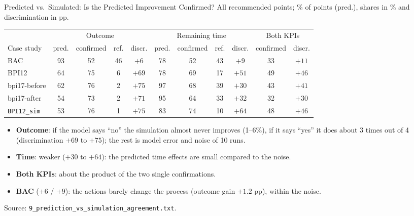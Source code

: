\documentclass[aspectratio=169]{beamer} %
\begin{document}
\iffalse
\begin{frame}{Predicted vs.\ Simulated: Is the Predicted Improvement Confirmed?}
  \footnotesize
  All recommended points; \% of points (pred.), shares in \% and discrimination in pp.
  \begin{center}\scriptsize\setlength{\tabcolsep}{3.5pt}
  \begin{tabular}{l cccc cccc cc}
    \toprule
     & \multicolumn{4}{c}{Outcome} & \multicolumn{4}{c}{Remaining time} & \multicolumn{2}{c}{Both KPIs} \\
    \cmidrule(lr){2-5}\cmidrule(lr){6-9}\cmidrule(lr){10-11}
    Case study & pred. & confirmed & ref. & discr. & pred. & confirmed & ref. & discr. & confirmed & discr. \\
    \midrule
    BAC                 & 93 & 52 & 46 & $+6$  & 78 & 52 & 43 & $+9$  & 33 & $+11$ \\
    BPI12               & 64 & 75 &  6 & $+69$ & 78 & 69 & 17 & $+51$ & 49 & $+46$ \\
    bpi17-before        & 62 & 76 &  2 & $+75$ & 97 & 68 & 39 & $+30$ & 43 & $+41$ \\
    bpi17-after         & 54 & 73 &  2 & $+71$ & 95 & 64 & 33 & $+32$ & 32 & $+30$ \\
    \texttt{BPI12\_sim} & 53 & 76 &  1 & $+75$ & 83 & 74 & 10 & $+64$ & 48 & $+46$ \\
    \bottomrule
  \end{tabular}
  \end{center}
  \scriptsize
  \begin{itemize}
    \item \textbf{Outcome}: if the model says ``no'' the simulation almost never improves (1--6\%), if it says
      ``yes'' it does about 3 times out of 4 (discrimination $+69$ to $+75$); the rest is model error and noise of 10 runs.
    \item \textbf{Time}: weaker ($+30$ to $+64$): the predicted time effects are small compared to the noise.
    \item \textbf{Both KPIs}: about the product of the two single confirmations.
    \item \textbf{BAC} ($+6$ / $+9$): the actions barely change the process (outcome gain $+1.2$ pp), within the noise.
  \end{itemize}
  {\scriptsize Source: \texttt{9\_prediction\_vs\_simulation\_agreement.txt}.}
\end{frame}
\end{document}
